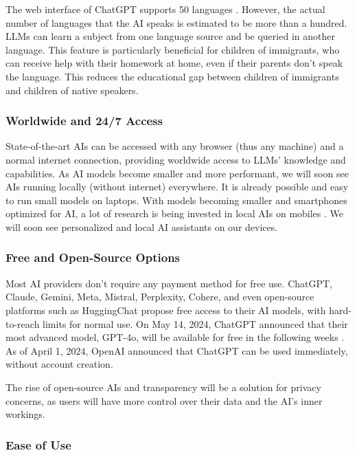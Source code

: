 \documentclass{article}
\begin{document}
The web interface of ChatGPT supports 50 languages \cite{openai_language_setting}.
However, the actual number of languages that the AI speaks
is estimated to be more than a hundred. LLMs can learn a
subject from one language source and be queried in another language.
This feature is particularly beneficial for children of immigrants,
who can receive help with their homework at home,
even if their parents don't speak the language.
This reduces the educational gap between children of immigrants
and children of native speakers.

\subsubsection{Worldwide and 24/7 Access}

State-of-the-art AIs can be accessed with any browser
(thus any machine) and a normal internet connection,
providing worldwide access to LLMs' knowledge and capabilities.
As AI models become smaller and more performant,
we will soon see AIs running locally (without internet) everywhere.
It is already possible and easy to run small models on laptops.
With models becoming smaller and smartphones optimized for AI,
a lot of research is being invested in local AIs on mobiles \cite{liu2024mobilellm}. We will soon see personalized and local AI assistants on our devices.

\subsubsection{Free and Open-Source Options}

Most AI providers don't require any payment method for free use.
ChatGPT, Claude, Gemini, Meta, Mistral, Perplexity, Cohere,
and even open-source platforms such as HuggingChat propose
free access to their AI models, with hard-to-reach limits for normal use.
On May 14, 2024, ChatGPT announced that their most advanced model,
GPT-4o, will be available for free in the following weeks
\cite{openai_gpt4o}. As of April 1, 2024,
OpenAI announced that ChatGPT can be used immediately,
without account creation.

The rise of open-source AIs and transparency will be a solution
for privacy concerns, as users will have more control over their
data and the AI's inner workings.

\subsubsection{Ease of Use}
\end{document}
